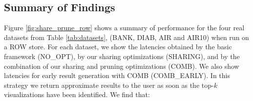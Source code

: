 \subsection{Summary of Findings}
\label{sec:expt_summary}

Figure \ref{fig:share_prune_row} shows a summary of \SeeDB performance for the four real datasets from Table \ref{tab:datasets}, (BANK, DIAB, AIR and AIR10) when run on a ROW store. 
For each dataset, we show the latencies obtained by the basic \SeeDB framework (NO\_OPT), by our sharing optimizations (SHARING), and by the combination of our sharing and pruning optimizations (COMB). 
We also show latencies for early result generation with COMB (COMB\_EARLY). 
In this strategy we return approximate results to the user as soon as the top-$k$ visualizations have been identified.
We find that: 


